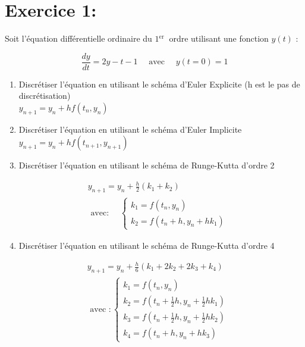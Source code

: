 \documentclass[10pt]{article}
\begin{document}
\section*{Exercice 1:}
Soit l'équation différentielle ordinaire du \(1{ }^{\text {er }}\) ordre utilisant une fonction \(y(t)\) :

\[
\frac{d y}{d t}=2 y-t-1 \quad \text { avec } \quad y(t=0)=1
\]

\begin{enumerate}
  \item Discrétiser l'équation en utilisant le schéma d'Euler Explicite (h est le pas de discrétisation)\\
\(y_{n+1}=y_{n}+h f\left(t_{n}, y_{n}\right)\)
  \item Discrétiser l'équation en utilisant le schéma d'Euler Implicite\\
\(y_{n+1}=y_{n}+h f\left(t_{n+1}, y_{n+1}\right)\)
  \item Discrétiser l'équation en utilisant le schéma de Runge-Kutta d'ordre 2
\end{enumerate}

\[
\begin{aligned}
& y_{n+1}=y_{n}+\frac{h}{2}\left(k_{1}+k_{2}\right) \\
& \text { avec: } \quad\left\{\begin{array}{c}
k_{1}=f\left(t_{n}, y_{n}\right) \\
k_{2}=f\left(t_{n}+h, y_{n}+h k_{1}\right)
\end{array}\right.
\end{aligned}
\]

\begin{enumerate}
  \setcounter{enumi}{3}
  \item Discrétiser l'équation en utilisant le schéma de Runge-Kutta d'ordre 4
\end{enumerate}

\[
\begin{aligned}
& y_{n+1}=y_{n}+\frac{h}{6}\left(k_{1}+2 k_{2}+2 k_{3}+k_{4}\right) \\
& \text { avec }:\left\{\begin{array}{c}
k_{1}=f\left(t_{n}, y_{n}\right) \\
k_{2}=f\left(t_{n}+\frac{1}{2} h, y_{n}+\frac{1}{2} h k_{1}\right) \\
k_{3}=f\left(t_{n}+\frac{1}{2} h, y_{n}+\frac{1}{2} h k_{2}\right) \\
k_{4}=f\left(t_{n}+h, y_{n}+h k_{3}\right)
\end{array}\right.
\end{aligned}
\]
\end{document}
